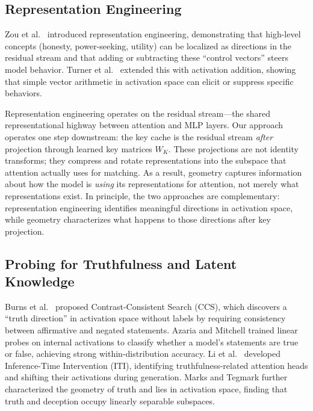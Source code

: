 \subsection{Representation Engineering}

Zou et al.\ \cite{zou2023} introduced representation engineering, demonstrating that high-level concepts (honesty, power-seeking, utility) can be localized as directions in the residual stream and that adding or subtracting these ``control vectors'' steers model behavior.
Turner et al.\ \cite{turner2023} extended this with activation addition, showing that simple vector arithmetic in activation space can elicit or suppress specific behaviors.

Representation engineering operates on the residual stream---the shared representational highway between attention and MLP layers.
Our approach operates one step downstream: the key cache is the residual stream \emph{after} projection through learned key matrices $W_K$.
These projections are not identity transforms; they compress and rotate representations into the subspace that attention actually uses for matching.
As a result, \kvcache geometry captures information about how the model is \emph{using} its representations for attention, not merely what representations exist.
In principle, the two approaches are complementary: representation engineering identifies meaningful directions in activation space, while \kvcache geometry characterizes what happens to those directions after key projection.

\subsection{Probing for Truthfulness and Latent Knowledge}

Burns et al.\ \cite{burns2022} proposed Contrast-Consistent Search (CCS), which discovers a ``truth direction'' in activation space without labels by requiring consistency between affirmative and negated statements.
Azaria and Mitchell \cite{azaria2023} trained linear probes on internal activations to classify whether a model's statements are true or false, achieving strong within-distribution accuracy.
Li et al.\ \cite{li2024} developed Inference-Time Intervention (ITI), identifying truthfulness-related attention heads and shifting their activations during generation.
Marks and Tegmark \cite{marks2024} further characterized the geometry of truth and lies in activation space, finding that truth and deception occupy linearly separable subspaces.

